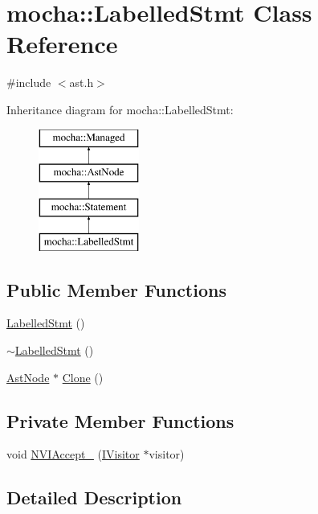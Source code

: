 \hypertarget{classmocha_1_1_labelled_stmt}{
\section{mocha::LabelledStmt Class Reference}
\label{classmocha_1_1_labelled_stmt}
}


{\ttfamily \#include $<$ast.h$>$}

Inheritance diagram for mocha::LabelledStmt:\begin{figure}[H]
\begin{center}
\leavevmode
\includegraphics[height=4.000000cm]{classmocha_1_1_labelled_stmt}
\end{center}
\end{figure}
\subsection*{Public Member Functions}
\begin{DoxyCompactItemize}
\item 
\hyperlink{classmocha_1_1_labelled_stmt_afb6be76c8984fd99c09467611646dc5a}{LabelledStmt} ()
\item 
\hyperlink{classmocha_1_1_labelled_stmt_acefefb1c75e7abcca5edebf4441470cf}{$\sim$LabelledStmt} ()
\item 
\hyperlink{classmocha_1_1_ast_node}{AstNode} $\ast$ \hyperlink{classmocha_1_1_labelled_stmt_a8263b7d092c64bdc9ef28cb3668d4f33}{Clone} ()
\end{DoxyCompactItemize}
\subsection*{Private Member Functions}
\begin{DoxyCompactItemize}
\item 
void \hyperlink{classmocha_1_1_labelled_stmt_ac53558b27dae5f5322602c7ea77606ee}{NVIAccept\_\-} (\hyperlink{classmocha_1_1_i_visitor}{IVisitor} $\ast$visitor)
\end{DoxyCompactItemize}


\subsection{Detailed Description}


